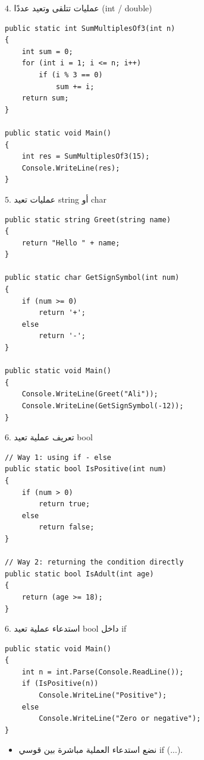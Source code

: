 \documentclass[13pt]{beamer}
\begin{document}
\begin{frame}[fragile]{$4$. عمليات تتلقى وتعيد عددًا (\textenglish{int / double})}
\begin{english}
\begin{lstlisting}[language=CSharp]
public static int SumMultiplesOf3(int n)
{
    int sum = 0;
    for (int i = 1; i <= n; i++)
        if (i % 3 == 0)
            sum += i;
    return sum;
}

public static void Main()
{
    int res = SumMultiplesOf3(15);
    Console.WriteLine(res);
}
\end{lstlisting}
\end{english}
\end{frame}

\begin{frame}[fragile]{$5$. عمليات تعيد \textenglish{string} أو \textenglish{char}}
\begin{english}
\begin{lstlisting}[language=CSharp]
public static string Greet(string name)
{
    return "Hello " + name;
}

public static char GetSignSymbol(int num)
{
    if (num >= 0)
        return '+';
    else
        return '-';
}

public static void Main()
{
    Console.WriteLine(Greet("Ali"));
    Console.WriteLine(GetSignSymbol(-12));
}
\end{lstlisting}
\end{english}
\end{frame}

\begin{frame}[fragile]{$6$. تعريف عملية تعيد \textenglish{bool}}
\begin{english}
\begin{lstlisting}[language=CSharp]
// Way 1: using if - else
public static bool IsPositive(int num)
{
    if (num > 0)
        return true;
    else
        return false;
}

// Way 2: returning the condition directly
public static bool IsAdult(int age)
{
    return (age >= 18);
}
\end{lstlisting}
\end{english}
\end{frame}

\begin{frame}[fragile]{$6$. استدعاء عملية تعيد \textenglish{bool} داخل \textenglish{if}}
\begin{english}
\begin{lstlisting}[language=CSharp]
public static void Main()
{
    int n = int.Parse(Console.ReadLine());
    if (IsPositive(n))
        Console.WriteLine("Positive");
    else
        Console.WriteLine("Zero or negative");
}
\end{lstlisting}
\end{english}
\vspace{0.2em}
\begin{itemize}
  \item نضع استدعاء العملية مباشرة بين قوسي \textenglish{if (...)}.
\end{itemize}
\end{frame}
\end{document}
